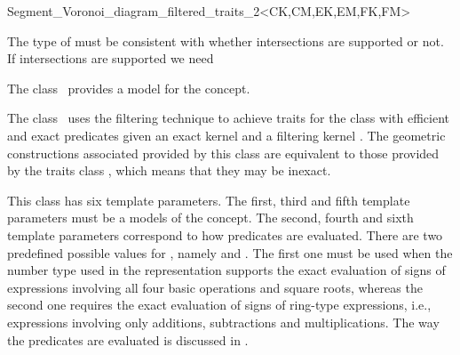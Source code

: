 


\begin{ccRefClass}
{Segment_Voronoi_diagram_filtered_traits_2<CK,CM,EK,EM,FK,FM>}


{\sc The type of  must be consistent with whether
  intersections are supported or not. If intersections are supported
  we need }

\ccDefinition
  
The class \ccRefName\ provides a model for the
 concept.

The class \ccRefName\ uses the filtering technique \cite{bbp-iayed-01}
to achieve traits for the 
class with efficient and exact predicates given an exact
kernel  and a filtering kernel . The geometric
constructions associated provided by this class are equivalent
to those provided by the traits class
, which means that they
may be inexact.

This class has six template parameters. The first, third and fifth
template parameters must be a models of the  concept. The
second, fourth and sixth template parameters correspond to how
predicates are evaluated. There are two predefined possible values for
, namely  and
. The first one must be used when the number type
used in the representation supports the exact evaluation of signs of
expressions involving all four basic operations and square roots,
whereas the second one requires the exact evaluation of signs of
ring-type expressions, i.e., expressions involving only additions,
subtractions and multiplications.
%
The way the predicates are evaluated is discussed in
\cite{b-ecvdl-96,k-peasv-04}.


\end{ccRefClass}

